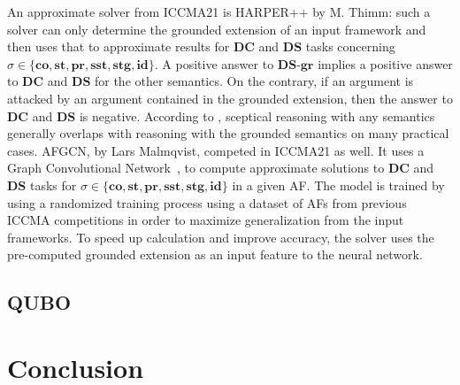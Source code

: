 \documentclass[conference]{IEEEtran}
\newcommand{\co}{\mathbf{co}}
\newcommand{\pr}{\mathbf{pr}}
\newcommand{\st}{\mathbf{st}}
\newcommand{\sst}{\mathbf{sst}}
\newcommand{\stg}{\mathbf{stg}}
\newcommand{\gr}{\mathbf{gr}}
\newcommand{\id}{\mathbf{id}}
\newcommand{\dc}{\mathbf{DC}}
\newcommand{\ds}{\mathbf{DS}}
\begin{document}
An approximate solver from ICCMA21 is HARPER++ by M. Thimm: such a solver can only  determine the grounded extension of an input framework and then uses that to approximate results for $\dc$ and $\ds$ tasks concerning $\sigma \in \{\co, \st, \pr, \sst, \stg, \id\}$. A positive answer to $\ds$-$\gr$ implies a positive answer to $\dc$ and $\ds$ for the other semantics. On the contrary, if an argument is attacked by an argument contained in the grounded extension, then the answer to $\dc$ and $\ds$ is negative. According to \cite{CeruttiTV20}, sceptical reasoning with any semantics generally overlaps with reasoning with the grounded semantics on many practical cases. AFGCN, by  Lars Malmqvist, competed in ICCMA21 as well. It uses a Graph Convolutional Network~\cite{WuPCLZY21}, to compute approximate solutions to  $\dc$ and $\ds$ tasks for $\sigma \in \{\co, \st, \pr, \sst, \stg, \id\}$ in a given AF. The model is trained by using a randomized training process using a dataset of AFs from previous ICCMA competitions in order to maximize generalization from the input frameworks. To speed up calculation and  improve accuracy, the solver uses the pre-computed grounded extension as an input feature to the neural network.
\fi

\subsection{QUBO}\label{sect:qubo}

\section{Conclusion}\label{sec:conclusion}




\end{document}
